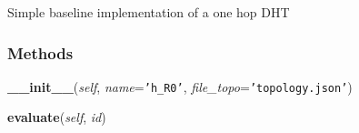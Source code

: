     \label{classic_dht:table_one_hop}
Simple baseline implementation of a one hop DHT



  \subsubsection{Methods}

    \label{classic_dht:table_one_hop:__init__}

    \vspace{0.5ex}

\hspace{.8\funcindent}\begin{boxedminipage}{\funcwidth}

    \raggedright \textbf{\_\_init\_\_}(\textit{self}, \textit{name}={\tt \texttt{'}\texttt{h\_R0}\texttt{'}}, \textit{file\_topo}={\tt \texttt{'}\texttt{topology.json}\texttt{'}})

\setlength{\parskip}{2ex}
\setlength{\parskip}{1ex}
    \end{boxedminipage}

    \label{classic_dht:table_one_hop:evaluate}

    \vspace{0.5ex}

\hspace{.8\funcindent}\begin{boxedminipage}{\funcwidth}

    \raggedright \textbf{evaluate}(\textit{self}, \textit{id})

\setlength{\parskip}{2ex}
\setlength{\parskip}{1ex}
    \end{boxedminipage}



